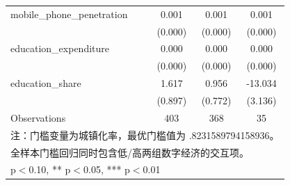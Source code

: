 \begin{table}[htbp]
\begin{tabular}{l*{3}{c}}
\addlinespace
mobile\_phone\_penetration&       0.001\sym{*}  &       0.001         &       0.001         \\
                    &     (0.000)         &     (0.000)         &     (0.000)         \\
\addlinespace
education\_expenditure&       0.000         &       0.000\sym{*}  &       0.000         \\
                    &     (0.000)         &     (0.000)         &     (0.000)         \\
\addlinespace
education\_share     &       1.617\sym{*}  &       0.956         &     -13.034\sym{*}  \\
                    &     (0.897)         &     (0.772)         &     (3.136)         \\
\midrule
Observations        &         403         &         368         &          35         \\
\bottomrule
\multicolumn{4}{l}{\footnotesize 注：门槛变量为城镇化率，最优门槛值为 .8231589794158936。}\\
\multicolumn{4}{l}{\footnotesize 全样本门槛回归同时包含低/高两组数字经济的交互项。}\\
\multicolumn{4}{l}{\footnotesize * p$<$0.10, ** p$<$0.05, *** p$<$0.01}\\
\end{tabular}
\end{table}
